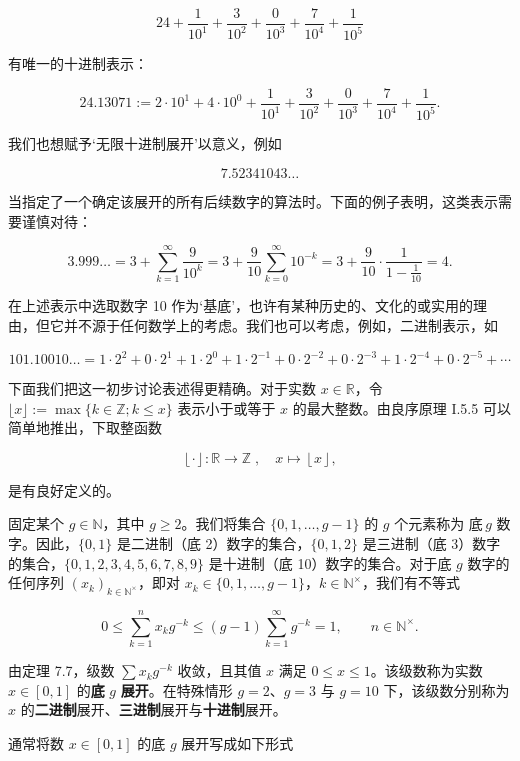 \[
24+\frac{1}{10^{1}}+\frac{3}{10^{2}}+\frac{0}{10^{3}}+\frac{7}{10^{4}}+\frac{1}{10^{5}}
\]

有唯一的十进制表示：

\[
24.13071:=2\cdot10^{1}+4\cdot10^{0}+\frac{1}{10^{1}}+\frac{3}{10^{2}}+\frac{0}{10^{3}}+\frac{7}{10^{4}}+\frac{1}{10^{5}}.
\]

我们也想赋予‘无限十进制展开’以意义，例如

\[
7.52341043\ldots
\]

当指定了一个确定该展开的所有后续数字的算法时。下面的例子表明，这类表示需要谨慎对待：

\[
3.999\ldots=3+\sum_{k=1}^{\infty}\frac{9}{10^{k}}=3+\frac{9}{10}\sum_{k=0}^{\infty}10^{-k}=3+\frac{9}{10}\cdot\frac{1}{1-\frac{1}{10}}=4.
\]

在上述表示中选取数字 10 作为‘基底’，也许有某种历史的、文化的或实用的理由，但它并不源于任何数学上的考虑。我们也可以考虑，例如，二进制表示，如

\[
101.10010\ldots=1\cdot2^{2}+0\cdot2^{1}+1\cdot2^{0}+1\cdot2^{-1}+0\cdot2^{-2}+0\cdot2^{-3}+1\cdot2^{-4}+0\cdot2^{-5}+\cdots
\]

下面我们把这一初步讨论表述得更精确。对于实数 $ x \in \mathbb{R} $，令 $ \lfloor x \rfloor := \max\{k \in \mathbb{Z} ; k \leq x\} $ 表示小于或等于 $ x $ 的最大整数。由良序原理 I.5.5 可以简单地推出，下取整函数

\[
\left\lfloor\cdot\right\rfloor:\mathbb{R}\to\mathbb{Z}\;,\quad x\mapsto\left\lfloor x\right\rfloor,
\]

是有良好定义的。

固定某个 $g \in \mathbb{N}$，其中 $g \geq 2$。我们将集合 $\{0,1,\ldots,g-1\}$ 的 $g$ 个元素称为 $\text{底}\,g$ 数字。因此，$\{0,1\}$ 是二进制（底 2）数字的集合，$\{0,1,2\}$ 是三进制（底 3）数字的集合，$\{0,1,2,3,4,5,6,7,8,9\}$ 是十进制（底 10）数字的集合。对于底 $g$ 数字的任何序列 $(x_k)_{k\in\mathbb{N}^\times}$，即对 $x_k\in\{0,1,\ldots,g-1\}$，$k\in\mathbb{N}^\times$，我们有不等式

\[
0\leq\sum_{k=1}^{n}x_{k}g^{-k}\leq(g-1)\sum_{k=1}^{\infty}g^{-k}=1,\qquad n\in\mathbb{N}^{\times}.
\]

由定理 7.7，级数 $ \sum x_k g^{-k} $ 收敛，且其值 $ x $ 满足 $ 0 \leq x \leq 1 $。该级数称为实数 $ x \in [0,1] $ 的\textbf{底} $ g $ \textbf{展开}。在特殊情形 $ g = 2 $、$ g = 3 $ 与 $ g = 10 $ 下，该级数分别称为 $ x $ 的\textbf{二进制}展开、\textbf{三进制}展开与\textbf{十进制}展开。

通常将数 $ x \in [0,1] $ 的底 $ g $ 展开写成如下形式

